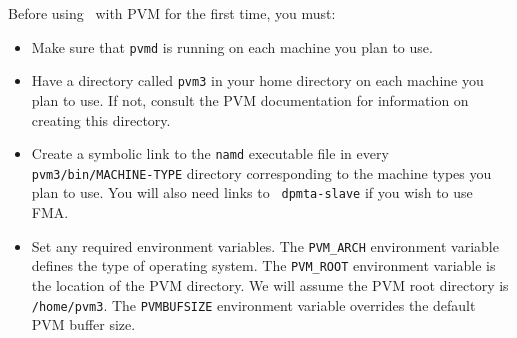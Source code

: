 Before using \NAMD\ with PVM for the first time, you must:
\begin{itemize}
  \item Make sure that {\tt pvmd} is running on each machine you plan
to use.

  \item Have a directory called {\tt pvm3} in your home
directory on each machine you plan to use.  If not, consult the PVM
documentation for information on creating this directory.

  \item Create a symbolic link to the {\tt namd} executable file in
every {\tt pvm3/bin/MACHINE-TYPE} directory corresponding to the
machine types you plan to use.  You will also need links to {\tt
dpmta-slave} if you wish to use FMA.

  \item Set any required environment variables.
The {\tt PVM\_ARCH} environment variable defines the type of operating system.
The {\tt PVM\_ROOT} environment variable is the location of the PVM directory.
We will assume the PVM root directory is {\tt /home/pvm3}.
The {\tt PVMBUFSIZE} environment variable overrides the default PVM buffer size.

\end{itemize}

